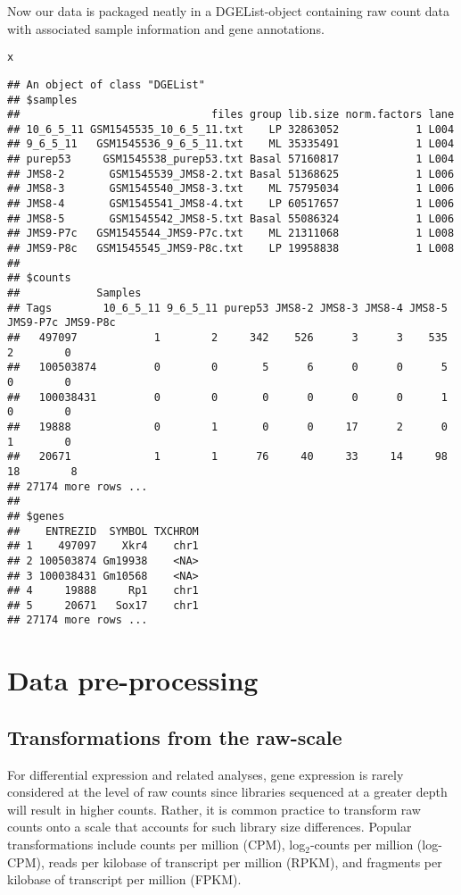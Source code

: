 \documentclass[10pt,a4paper]{extarticle}\usepackage[]{graphicx}\usepackage[]{color}
\makeatletter
\newcommand{\hlstd}[1]{\textcolor[rgb]{0.345,0.345,0.345}{#1}}%
\newenvironment{kframe}{%
 \def\at@end@of@kframe{}%
 \ifinner\ifhmode%
  \def\at@end@of@kframe{\end{minipage}}%
  \begin{minipage}{\columnwidth}%
 \fi\fi%
 \def\FrameCommand##1{\hskip\@totalleftmargin \hskip-\fboxsep
 \colorbox{shadecolor}{##1}\hskip-\fboxsep
     \hskip-\linewidth \hskip-\@totalleftmargin \hskip\columnwidth}%
 \MakeFramed {\advance\hsize-\width
   \@totalleftmargin\z@ \linewidth\hsize
   \@setminipage}}%
 {\par\unskip\endMakeFramed%
 \at@end@of@kframe}
\newenvironment{knitrout}{}{} %
\makeatother
\begin{document}
Now our data is packaged neatly in a DGEList-object containing raw count data with associated sample information and gene annotations.
\begin{knitrout}
\color{fgcolor}\begin{kframe}
\begin{alltt}
\hlstd{x}
\end{alltt}
\begin{verbatim}
## An object of class "DGEList"
## $samples
##                              files group lib.size norm.factors lane
## 10_6_5_11 GSM1545535_10_6_5_11.txt    LP 32863052            1 L004
## 9_6_5_11   GSM1545536_9_6_5_11.txt    ML 35335491            1 L004
## purep53     GSM1545538_purep53.txt Basal 57160817            1 L004
## JMS8-2       GSM1545539_JMS8-2.txt Basal 51368625            1 L006
## JMS8-3       GSM1545540_JMS8-3.txt    ML 75795034            1 L006
## JMS8-4       GSM1545541_JMS8-4.txt    LP 60517657            1 L006
## JMS8-5       GSM1545542_JMS8-5.txt Basal 55086324            1 L006
## JMS9-P7c   GSM1545544_JMS9-P7c.txt    ML 21311068            1 L008
## JMS9-P8c   GSM1545545_JMS9-P8c.txt    LP 19958838            1 L008
## 
## $counts
##            Samples
## Tags        10_6_5_11 9_6_5_11 purep53 JMS8-2 JMS8-3 JMS8-4 JMS8-5 JMS9-P7c JMS9-P8c
##   497097            1        2     342    526      3      3    535        2        0
##   100503874         0        0       5      6      0      0      5        0        0
##   100038431         0        0       0      0      0      0      1        0        0
##   19888             0        1       0      0     17      2      0        1        0
##   20671             1        1      76     40     33     14     98       18        8
## 27174 more rows ...
## 
## $genes
##    ENTREZID  SYMBOL TXCHROM
## 1    497097    Xkr4    chr1
## 2 100503874 Gm19938    <NA>
## 3 100038431 Gm10568    <NA>
## 4     19888     Rp1    chr1
## 5     20671   Sox17    chr1
## 27174 more rows ...
\end{verbatim}
\end{kframe}
\end{knitrout}


\section*{Data pre-processing}

\subsection*{Transformations from the raw-scale}
For differential expression and related analyses, gene expression is rarely considered at the level of raw counts since libraries sequenced at a greater depth will result in higher counts. Rather, it is common practice to transform raw counts onto a scale that accounts for such library size differences. Popular transformations include counts per million (CPM), log$_2$-counts per million (log-CPM), reads per kilobase of transcript per million (RPKM), and fragments per kilobase of transcript per million (FPKM).\\
\end{document}
